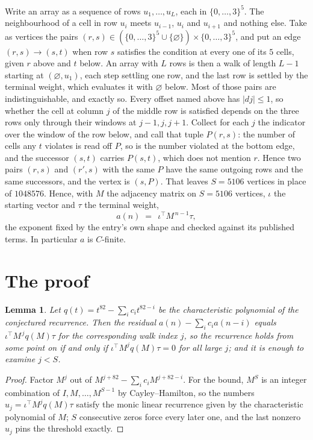 \documentclass[11pt,a4paper]{article}
\theoremstyle{plain}
\newtheorem{lemma}[theorem]{Lemma}
\theoremstyle{definition}
\begin{document}
Write an array as a sequence of rows $u_1,\dots,u_L$, each in
$\{0,\dots,3\}^{5}$. The neighbourhood of a cell in row $u_i$ meets $u_{i-1}$,
$u_i$ and $u_{i+1}$ and nothing else. Take as vertices the pairs
$(r,s)\in(\{0,\dots,3\}^{5}\cup\{\varnothing\})\times\{0,\dots,3\}^{5}$,
and put an edge $(r,s)\to(s,t)$ when row $s$ satisfies the condition at every one of its
$5$ cells, given $r$ above and $t$ below. An array with $L$ rows is then a walk of length
$L-1$ starting at $(\varnothing,u_1)$, each step settling one row, and the last row is
settled by the terminal weight, which evaluates it with $\varnothing$ below. Most of those pairs are indistinguishable, and exactly so. Every offset named above has $|dj|\le 1$, so whether the cell at column $j$ of the middle row is satisfied depends on the three rows only through their windows at $j-1,j,j+1$. Collect for each $j$ the indicator over the window of the row below, and call that tuple $P(r,s)$: the number of cells any $t$ violates is read off $P$, so is the number violated at the bottom edge, and the successor $(s,t)$ carries $P(s,t)$, which does not mention $r$. Hence two pairs $(r,s)$ and $(r',s)$ with the same $P$ have the same outgoing rows and the same successors, and the vertex is $(s,P)$. That leaves $S=5106$ vertices in place of $1048576$. Hence,
with $M$ the adjacency matrix on $S=5106$ vertices, $\iota$ the starting vector and $\tau$ the
terminal weight,
\[
a(n)\;=\;\,\iota^{\!\top}M^{\,n-1}\tau ,
\]
the exponent fixed by the entry's own shape and checked against its published terms. In
particular $a$ is $C$-finite.

\section{The proof}

\begin{lemma}\label{lem:crit}
Let $q(t)=t^{82}-\sum_i c_it^{82-i}$ be the characteristic polynomial of the
conjectured recurrence. Then the residual $a(n)-\sum_ic_ia(n-i)$ equals
$\iota^{\!\top}M^{\,j}q(M)\tau$ for the corresponding walk index $j$, so the
recurrence holds from some point on if and only if $\iota^{\!\top}M^{j}q(M)\tau=0$ for all
large $j$; and it is enough to examine $j<S$.
\end{lemma}

\begin{proof}
Factor $M^{j}$ out of $M^{j+82}-\sum_ic_iM^{j+82-i}$. For the bound, $M^{S}$
is an integer combination of $I,M,\dots,M^{S-1}$ by Cayley--Hamilton, so the numbers
$u_j=\iota^{\!\top}M^{j}q(M)\tau$ satisfy the monic linear recurrence given by the
characteristic polynomial of $M$; $S$ consecutive zeros force every later one, and the last
nonzero $u_j$ pins the threshold exactly.
\end{proof}
\end{document}
